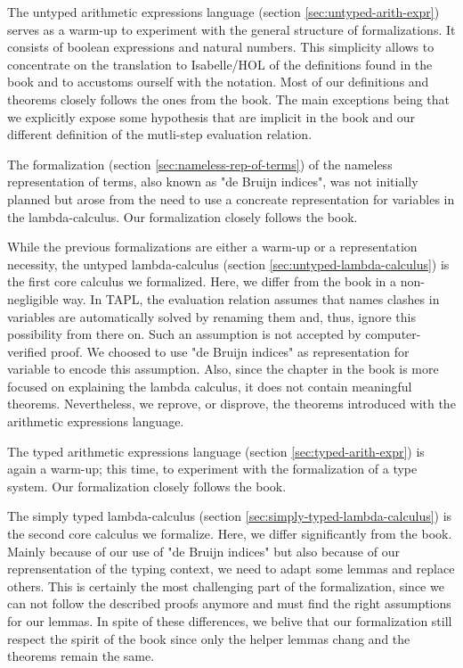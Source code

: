 The untyped arithmetic expressions language (section \ref{sec:untyped-arith-expr}) serves as a
warm-up to experiment with the general structure of formalizations. It consists of boolean
expressions and natural numbers. This simplicity allows to concentrate on the translation to
Isabelle/HOL of the definitions found in the book and to accustoms ourself with the notation. Most
of our definitions and theorems closely follows the ones from the book. The main exceptions being
that we explicitly expose some hypothesis that are implicit in the book and our different definition
of the mutli-step evaluation relation.

The formalization (section \ref{sec:nameless-rep-of-terms}) of the nameless representation of terms,
also known as "de Bruijn indices", was not initially planned but arose from the need to use a
concreate representation for variables in the lambda-calculus. Our formalization closely follows the
book.

While the previous formalizations are either a warm-up or a representation necessity, the untyped
lambda-calculus (section \ref{sec:untyped-lambda-calculus}) is the first core calculus we
formalized. Here, we differ from the book in a non-negligible way. In TAPL, the evaluation
relation assumes that names clashes in variables are automatically solved by renaming them and,
thus, ignore this possibility from there on. Such an assumption is not accepted by computer-verified
proof. We choosed to use "de Bruijn indices" as representation for variable to encode this
assumption. Also, since the chapter in the book is more focused on explaining the lambda calculus,
it does not contain meaningful theorems. Nevertheless, we reprove, or disprove, the theorems
introduced with the arithmetic expressions language.

The typed arithmetic expressions language (section \ref{sec:typed-arith-expr}) is again a warm-up;
this time, to experiment with the formalization of a type system. Our formalization closely follows
the book.

The simply typed lambda-calculus (section \ref{sec:simply-typed-lambda-calculus}) is the second core
calculus we formalize. Here, we differ significantly from the book. Mainly because of our use of "de
Bruijn indices" but also because of our reprensentation of the typing context, we need to adapt some
lemmas and replace others. This is certainly the most challenging part of the formalization, since
we can not follow the described proofs anymore and must find the right assumptions for our lemmas.
In spite of these differences, we belive that our formalization still respect the spirit of the book
since only the helper lemmas chang and the theorems remain the same.

